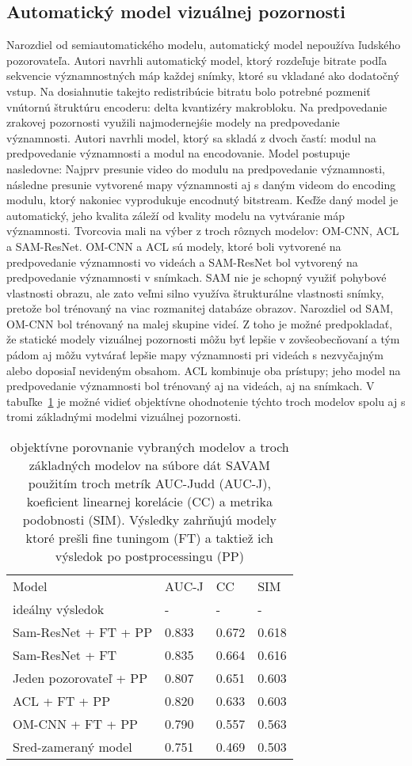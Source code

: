 \documentclass[10pt,twoside,slovak,a4paper]{article}
\begin{document}
\subsection{Automatický model vizuálnej pozornosti} \label{auto}
Narozdiel od semiautomatického modelu, automatický model nepoužíva ľudského pozorovateľa. Autori\cite{Czarnecki:Progress} navrhli automatický model, ktorý rozdeľuje bitrate podľa sekvencie významnostných máp každej snímky, ktoré su vkladané ako dodatočný vstup. Na dosiahnutie takejto redistribúcie bitratu bolo potrebné pozmeniť vnútornú štruktúru encoderu: delta kvantizéry makrobloku. Na predpovedanie zrakovej pozornosti využili najmodernejśie modely na predpovedanie významnosti. Autori\cite{Czarnecki:Progress} navrhli model, ktorý sa skladá z dvoch častí: modul na predpovedanie významnosti a modul na encodovanie. Model postupuje nasledovne: Najprv presunie video do modulu na predpovedanie významnosti, následne presunie vytvorené mapy významnosti aj s daným videom do encoding modulu, ktorý nakoniec vyprodukuje encodnutý bitstream. Keďže daný model je automatický, jeho kvalita záleží od kvality modelu na vytváranie máp významnosti. Tvorcovia mali na výber z troch rôznych modelov: OM-CNN, ACL a SAM-ResNet. OM-CNN a ACL sú modely, ktoré boli vytvorené na predpovedanie významnosti vo videách a SAM-ResNet bol vytvorený na predpovedanie významnosti v snímkach. SAM nie je schopný využiť pohybové vlastnosti obrazu, ale zato veľmi silno využíva štrukturálne vlastnosti snímky, pretože bol trénovaný na viac rozmanitej databáze obrazov. Narozdiel od SAM, OM-CNN bol trénovaný na malej skupine videí. Z toho je možné predpokladať, že statické modely vizuálnej pozornosti môžu byť lepšie v zovšeobecňovaní a tým pádom aj môžu vytvárať lepšie mapy významnosti pri videách s nezvyčajným alebo doposiaľ nevideným obsahom. ACL kombinuje oba prístupy; jeho model na predpovedanie významnosti bol trénovaný aj na videách, aj na snímkach. V tabuľke~\ref{tab:mapy} je možné vidieť objektívne ohodnotenie týchto troch modelov spolu aj s tromi základnými modelmi vizuálnej pozornosti.
\begin{table}[h]
\caption{objektívne porovnanie vybraných modelov a troch základných modelov na súbore dát SAVAM použitím troch metrík AUC-Judd (AUC-J), koeficient linearnej korelácie (CC) a metrika podobnosti (SIM). Výsledky zahrňujú modely ktoré prešli fine tuningom (FT) a taktiež ich výsledok po postprocessingu (PP)\\}
\label{tab:mapy}
\begin{tabular}{llll}
Model                  & AUC-J & CC    & SIM   \\
ideálny výsledok       & -     & -     & -     \\
Sam-ResNet + FT + PP   & 0.833 & 0.672 & 0.618 \\
Sam-ResNet + FT        & 0.835 & 0.664 & 0.616 \\
Jeden pozorovateľ + PP & 0.807 & 0.651 & 0.603 \\
ACL + FT + PP          & 0.820 & 0.633 & 0.603 \\
OM-CNN + FT + PP       & 0.790 & 0.557 & 0.563 \\
Sred-zameraný model    & 0.751 & 0.469 & 0.503
\end{tabular}
\end{table}
\end{document}
